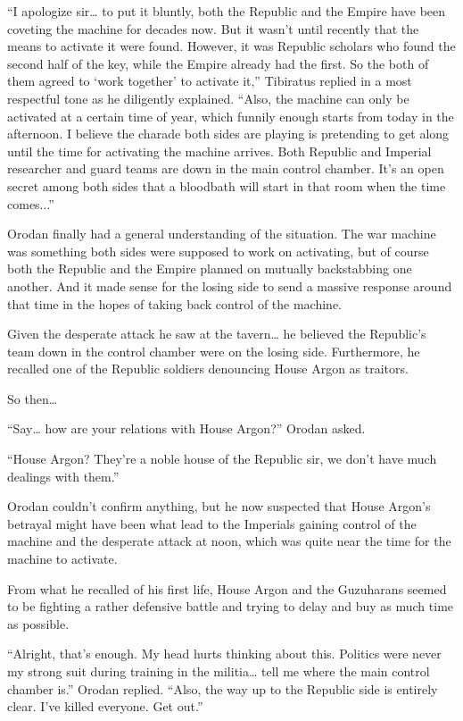 \documentclass[a4paper,10pt]{book}
\begin{document}
“I apologize sir… to put it bluntly, both the Republic and the Empire have been coveting the machine for decades now. But it wasn’t until recently that the means to activate it were found. However, it was Republic scholars who found the second half of the key, while the Empire already had the first. So the both of them agreed to ‘work together’ to activate it,” Tibiratus replied in a most respectful tone as he diligently explained. “Also, the machine can only be activated at a certain time of year, which funnily enough starts from today in the afternoon. I believe the charade both sides are playing is pretending to get along until the time for activating the machine arrives. Both Republic and Imperial researcher and guard teams are down in the main control chamber. It’s an open secret among both sides that a bloodbath will start in that room when the time comes...”\par
Orodan finally had a general understanding of the situation. The war machine was something both sides were supposed to work on activating, but of course both the Republic and the Empire planned on mutually backstabbing one another. And it made sense for the losing side to send a massive response around that time in the hopes of taking back control of the machine.\par
Given the desperate attack he saw at the tavern… he believed the Republic’s team down in the control chamber were on the losing side. Furthermore, he recalled one of the Republic soldiers denouncing House Argon as traitors.\par
So then…\par
“Say… how are your relations with House Argon?” Orodan asked.\par
“House Argon? They’re a noble house of the Republic sir, we don’t have much dealings with them.”\par
Orodan couldn’t confirm anything, but he now suspected that House Argon’s betrayal might have been what lead to the Imperials gaining control of the machine and the desperate attack at noon, which was quite near the time for the machine to activate.\par
From what he recalled of his first life, House Argon and the Guzuharans seemed to be fighting a rather defensive battle and trying to delay and buy as much time as possible.\par
“Alright, that’s enough. My head hurts thinking about this. Politics were never my strong suit during training in the militia… tell me where the main control chamber is.” Orodan replied. “Also, the way up to the Republic side is entirely clear. I’ve killed everyone. Get out.”\par
\end{document}
